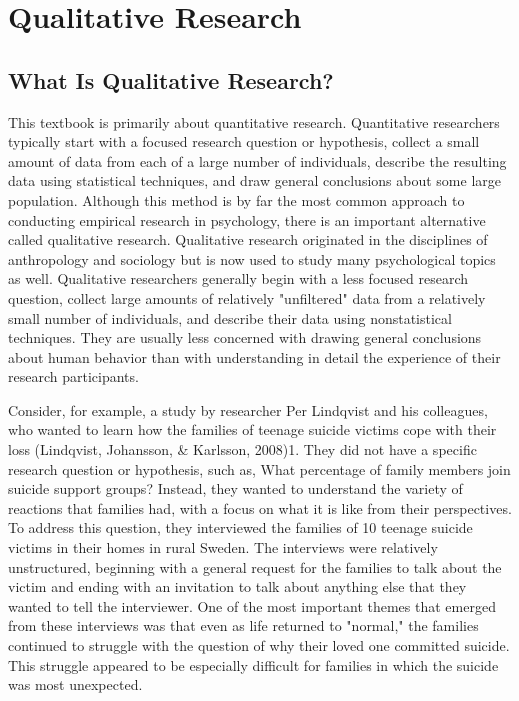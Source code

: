 \newpage
\section{Qualitative Research}
  


\subsection{What Is Qualitative Research?}

This textbook is primarily about quantitative research. Quantitative researchers typically start with a focused research question or hypothesis, collect a small amount of data from each of a large number of individuals, describe the resulting data using statistical techniques, and draw general conclusions about some large population. Although this method is by far the most common approach to conducting empirical research in psychology, there is an important alternative called qualitative research. Qualitative research originated in the disciplines of anthropology and sociology but is now used to study many psychological topics as well. Qualitative researchers generally begin with a less focused research question, collect large amounts of relatively "unfiltered" data from a relatively small number of individuals, and describe their data using nonstatistical techniques. They are usually less concerned with drawing general conclusions about human behavior than with understanding in detail the experience of their research participants.

Consider, for example, a study by researcher Per Lindqvist and his colleagues, who wanted to learn how the families of teenage suicide victims cope with their loss (Lindqvist, Johansson, \& Karlsson, 2008)1. They did not have a specific research question or hypothesis, such as, What percentage of family members join suicide support groups? Instead, they wanted to understand the variety of reactions that families had, with a focus on what it is like from their perspectives. To address this question, they interviewed the families of 10 teenage suicide victims in their homes in rural Sweden. The interviews were relatively unstructured, beginning with a general request for the families to talk about the victim and ending with an invitation to talk about anything else that they wanted to tell the interviewer. One of the most important themes that emerged from these interviews was that even as life returned to "normal," the families continued to struggle with the question of why their loved one committed suicide. This struggle appeared to be especially difficult for families in which the suicide was most unexpected.

